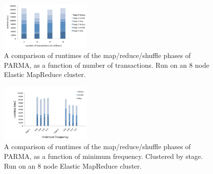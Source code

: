 \begin{figure}[tb]
\centering
    \includegraphics[width=0.4\textwidth]{parma/breakdown1}
  \caption{A comparison of runtimes of the map/reduce/shuffle phases
of PARMA, as a function of number of transactions. Run on
an 8 node Elastic MapReduce cluster.}
\label{fig:breakdown1}
\end{figure}

\begin{figure}[tb]
  \centering
    \includegraphics[width=0.4\textwidth]{parma/frequency}
  \caption{A comparison of runtimes of the map/reduce/shuffle phases
of PARMA, as a function of minimum frequency. Clustered by stage. Run
on an 8 node Elastic MapReduce cluster.}
\label{fig:frequency}
\end{figure}


